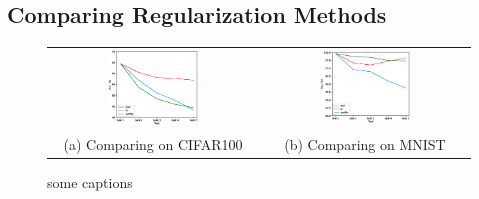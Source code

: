 \documentclass[final]{cvpr}
\begin{document}
\subsection{Comparing Regularization Methods}

\begin{figure}[b]
    \centering
	\begin{tabular}{c@{\hskip0.5cm}c}
		\includegraphics[width=0.45\textwidth]{resources/comp_CIFAR.eps}&%
        \includegraphics[width=0.45\textwidth]{resources/comp_MNIST.eps}\\%
        (a) Comparing on CIFAR100 & (b) Comparing on MNIST\\
	\end{tabular}\vspace{0.2cm}
	\caption{some captions}
\end{figure}


{\small


}
\end{document}
